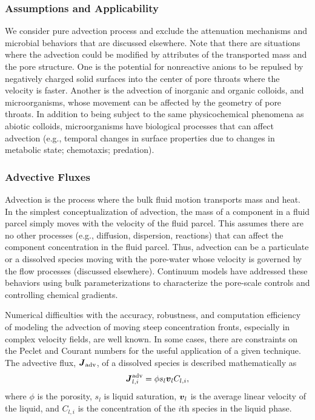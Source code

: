 \subsubsection{Assumptions and Applicability}

We consider pure advection process and exclude the attenuation mechanisms and microbial 
behaviors that are discussed elsewhere. 
Note that there are situations where the advection could be modified by attributes of 
the transported mass and the pore structure.  
One is the potential for nonreactive anions to be repulsed by negatively charged 
solid surfaces into the center of pore throats where the velocity is faster.  
Another is the advection of inorganic and organic colloids, and microorganisms, 
whose movement can be affected by the geometry of pore throats.  
In addition to being subject to the same physicochemical phenomena as abiotic colloids, 
microorganisms have biological processes that can affect advection (e.g., temporal 
changes in surface properties due to changes in metabolic state; chemotaxis; predation).  


\subsubsection{Advective Fluxes}  
\label{sec:transport-advection}

Advection is the process where the bulk fluid motion transports mass and heat.  
In the simplest conceptualization of advection, the mass of a component in a fluid 
parcel simply moves with the velocity of the fluid parcel.  
This assumes there are no other processes (e.g., diffusion, dispersion, reactions) 
that can affect the component concentration in the fluid parcel.  
Thus, advection can be a particulate or a dissolved species moving with the pore-water 
whose velocity is governed by the flow processes (discussed elsewhere).  
Continuum models have addressed these behaviors using bulk parameterizations 
to characterize the pore-scale controls and controlling chemical gradients.

Numerical difficulties with the accuracy, robustness, and computation efficiency 
of modeling the advection of moving steep concentration fronts, especially in 
complex velocity fields, are well known.  
In some cases, there are constraints on the Peclet and Courant numbers for the 
useful application of a given technique.
The advective flux, ${\boldsymbol{J}}_{\text{adv}}$, of a dissolved species is described 
mathematically as
\begin{equation} \label{eq:AdvectiveFlux} 
  {\boldsymbol{J}}_{l,i}^\text{adv} = \phi s_l \boldsymbol{v}_l C_{l,i},  
\end{equation}
where $\phi$ is the porosity, $s_l$ is liquid saturation, $\boldsymbol{v}_l$ is the 
average linear velocity of the liquid, and $C_{l,i}$ is the concentration of the $i$th species in the liquid phase.


